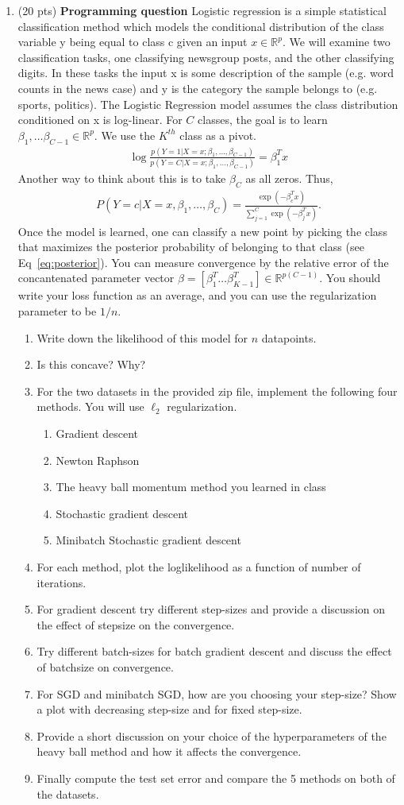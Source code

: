 \documentclass[11pt]{article}
\newcommand{\bi}{\begin{enumerate}}
\newcommand{\ib}{\end{enumerate}}
\newcommand{\p}{\item}
\begin{document}
\begin{enumerate}
\item (20 pts) \textbf{Programming question} 
Logistic regression is a simple statistical classification method which models the conditional
distribution of the class variable y being equal to class c given an input $x\in \mathbb{R}^p$.
 We will  examine two classification tasks, one classifying newsgroup posts, and the other classifying digits. In these tasks the input x is some description of the sample (e.g. word counts in the news case) and y is the category the sample belongs to (e.g. sports, politics). The Logistic Regression model assumes the class distribution conditioned on x is log-linear. For $C$ classes, the goal is to learn $\beta_1,\dots \beta_{C-1}\in \mathbb{R}^p$. We use the $K^{th}$ class as a pivot.
 \begin{align*}
 \log \frac{p(Y=1|X=x;\beta_{1},\dots,\beta_{C-1})}{p(Y=C|X=x;\beta_{1},\dots,\beta_{C-1})}=\beta_1^T x
 \end{align*}
 Another way to think about this is to take $\beta_C$ as all zeros. Thus,
 \begin{align}\label{eq:posterior}
 P(Y=c|X=x,\beta_{1},\dots,\beta_{C})=\frac{\exp(-\beta_c^T x)}{\sum_{j=1}^C\exp(-\beta_j^Tx)}.
 \end{align}
 Once the model is learned, one can classify a new point by picking the class that maximizes the posterior probability of belonging to that class (see Eq~\ref{eq:posterior}). You can measure convergence by the relative error of the concantenated parameter vector $\beta=[\beta_1^T \dots \beta_{K-1}^T]\in\mathbb{R}^{p(C-1)}$. You should write your loss function as an average, and you can use the regularization parameter to be $1/n$.
 \bi
 \p Write down the likelihood of this model for $n$ datapoints.
 \p Is this concave? Why?
 \p For the two datasets in the provided zip file, implement the following four methods. You will use $\ell_2$ regularization.
\bi
\p Gradient descent
\p Newton Raphson
\p The heavy ball momentum method you learned in class
\p Stochastic gradient descent
\p Minibatch Stochastic gradient descent
\ib
\p For each method, plot the loglikelihood as a function of number of iterations.
\p For gradient descent  try different step-sizes and provide a discussion on the effect of stepsize on the convergence.
\p Try different batch-sizes for batch gradient descent and discuss the effect of batchsize on convergence.
\p For SGD and minibatch SGD, how are you choosing your step-size? 
Show a plot with decreasing step-size and for fixed step-size.
\p Provide a short discussion on your choice of the hyperparameters of the heavy ball method and how it affects the convergence.
\p Finally compute the test set error and compare the 5 methods on both of the datasets.
 \ib
\end{enumerate}
\end{document}
